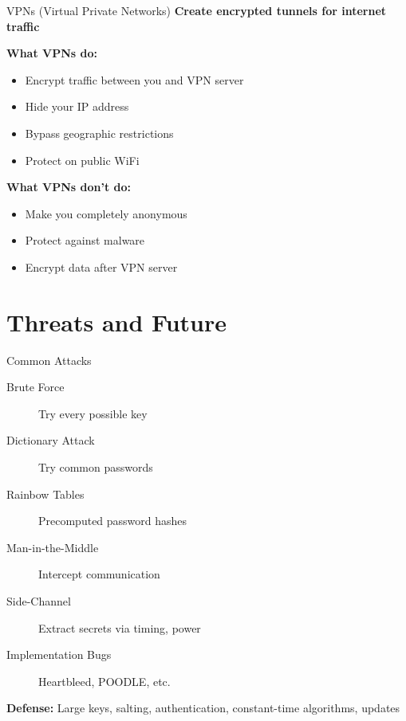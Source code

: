 \documentclass{beamer}
\begin{document}
\begin{frame}{VPNs (Virtual Private Networks)}
\textbf{Create encrypted tunnels for internet traffic}

\vspace{0.3cm}
\textbf{What VPNs do:}
\begin{itemize}
    \item Encrypt traffic between you and VPN server
    \item Hide your IP address
    \item Bypass geographic restrictions
    \item Protect on public WiFi
\end{itemize}

\vspace{0.3cm}
\textbf{What VPNs don't do:}
\begin{itemize}
    \item Make you completely anonymous
    \item Protect against malware
    \item Encrypt data after VPN server
\end{itemize}

\end{frame}

\section{Threats and Future}

\begin{frame}{Common Attacks}
\begin{description}
    \item[Brute Force] Try every possible key
    \item[Dictionary Attack] Try common passwords
    \item[Rainbow Tables] Precomputed password hashes
    \item[Man-in-the-Middle] Intercept communication
    \item[Side-Channel] Extract secrets via timing, power
    \item[Implementation Bugs] Heartbleed, POODLE, etc.
\end{description}

\vspace{0.3cm}
\textbf{Defense:} Large keys, salting, authentication, constant-time algorithms, updates
\end{frame}
\end{document}
